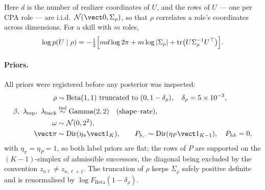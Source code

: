 Here $d$ is the number of realizer coordinates of $U$, and the rows of $U$ ---
one per CPA role --- are i.i.d.\ $\mathcal N(\vect 0,\Sigma_\rho)$, so that
$\rho$ correlates a role's coordinates across dimensions.  For a skill with $m$
roles,
\begin{equation}
  \log p(U\mid\rho)
  =
  -\tfrac12\Bigl[
    md\log 2\pi + m\log|\Sigma_\rho|
    + \operatorname{tr}\bigl(U\Sigma_\rho^{-1}U^\top\bigr)
  \Bigr].
\end{equation}

\paragraph{Priors.}
All priors were registered before any posterior was inspected:
\begin{align}
  \rho &\sim \mathrm{Beta}(1,1)\ \text{truncated to } (0,1-\delta_\rho),
        \quad \delta_\rho=5\times10^{-3},\\
  \beta,\ \lambda_{\mathrm{rep}},\ \lambda_{\mathrm{back}}
       &\stackrel{\text{ind}}{\sim} \mathrm{Gamma}(2,2)
        \quad\text{(shape--rate)},\\
  \omega &\sim \mathcal N(0,2^2),\\
  \vect\pi &\sim \mathrm{Dir}(\eta_\pi\vect 1_K),\qquad
  P_{h,\cdot}\sim \mathrm{Dir}(\eta_P\vect 1_{K-1}),\quad P_{hh}=0,
\end{align}
with $\eta_\pi=\eta_P=1$, so both label priors are flat; the rows of $P$ are
supported on the $(K{-}1)$-simplex of admissible successors, the diagonal being
excluded by the convention $z_{n\ell}\neq z_{n,\ell+1}$.  The truncation of
$\rho$ keeps $\Sigma_\rho$ safely positive definite and is renormalised by
$\log F_{\mathrm{Beta}}(1-\delta_\rho)$.

